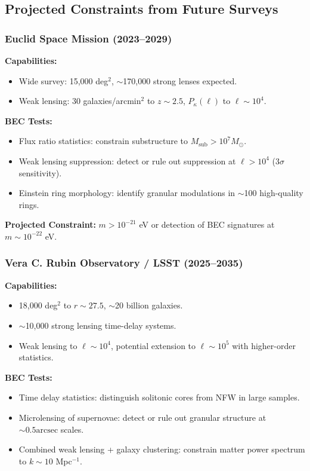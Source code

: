 \documentclass[11pt,a4paper]{article}
\newcommand{\Msun}{\ensuremath{M_\odot}}
\newcommand{\arcsec}{\ensuremath{\text{arcsec}}}
\theoremstyle{definition}
\theoremstyle{remark}
\begin{document}
\subsection{Projected Constraints from Future Surveys}
\label{sec:future_surveys}

\subsubsection{Euclid Space Mission (2023--2029)}

\textbf{Capabilities:}
\begin{itemize}[leftmargin=*, itemsep=0.2em]
\item Wide survey: 15,000 deg$^2$, $\sim$170,000 strong lenses expected.
\item Weak lensing: 30 galaxies/arcmin$^2$ to $z \sim 2.5$, $P_\kappa(\ell)$ to $\ell \sim 10^4$.
\end{itemize}

\textbf{BEC Tests:}
\begin{itemize}[leftmargin=*, itemsep=0.2em]
\item Flux ratio statistics: constrain substructure to $M_{\mathrm{sub}} > 10^7 \Msun$.
\item Weak lensing suppression: detect or rule out suppression at $\ell > 10^4$ (3$\sigma$ sensitivity).
\item Einstein ring morphology: identify granular modulations in $\sim$100 high-quality rings.
\end{itemize}

\textbf{Projected Constraint:} $m > 10^{-21}$ eV or detection of BEC signatures at $m \sim 10^{-22}$ eV.

\subsubsection{Vera C. Rubin Observatory / LSST (2025--2035)}

\textbf{Capabilities:}
\begin{itemize}[leftmargin=*, itemsep=0.2em]
\item 18,000 deg$^2$ to $r \sim 27.5$, $\sim$20 billion galaxies.
\item $\sim$10,000 strong lensing time-delay systems.
\item Weak lensing to $\ell \sim 10^4$, potential extension to $\ell \sim 10^5$ with higher-order statistics.
\end{itemize}

\textbf{BEC Tests:}
\begin{itemize}[leftmargin=*, itemsep=0.2em]
\item Time delay statistics: distinguish solitonic cores from NFW in large samples.
\item Microlensing of supernovae: detect or rule out granular structure at $\sim 0.5\arcsec$ scales.
\item Combined weak lensing + galaxy clustering: constrain matter power spectrum to $k \sim 10$ Mpc$^{-1}$.
\end{itemize}
\end{document}
